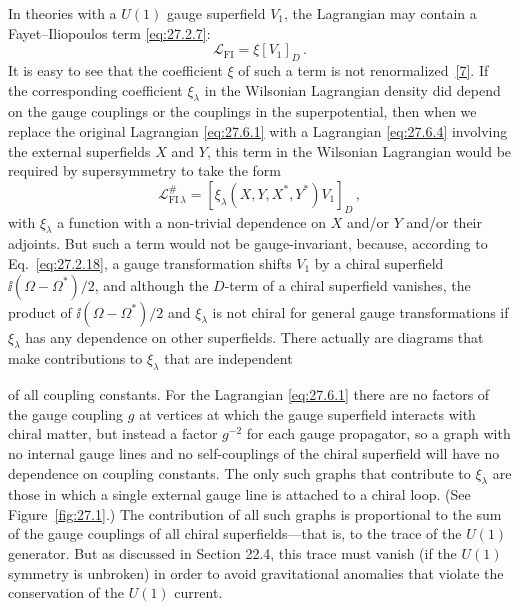 In theories with a \(U(1)\) gauge superfield \(V_1\), the Lagrangian may
contain a Fayet--Iliopoulos term \eqref{eq:27.2.7}:
\begin{equation}
  \mathcal{L}_{\mathrm{FI}}=\xi[V_1]_D\,.
  \tag{27.6.15}\label{eq:27.6.15}
\end{equation}
It is easy to see that the coefficient \(\xi\) of such a term is not
renormalized~\hyperref[ch27-ref-7]{[7]}. If the corresponding coefficient
\(\xi_\lambda\) in the Wilsonian Lagrangian density did depend on the gauge
couplings or the couplings in the superpotential, then when we replace the
original Lagrangian \eqref{eq:27.6.1} with a Lagrangian
\eqref{eq:27.6.4} involving the external superfields \(X\) and \(Y\), this
term in the Wilsonian Lagrangian would be required by supersymmetry to take
the form
\begin{equation}
  \mathcal{L}^{\#}_{\mathrm{FI}\,\lambda}
  =
  \left[
    \xi_\lambda(X,Y,X^*,Y^*)V_1
  \right]_D\,,
  \tag{27.6.16}\label{eq:27.6.16}
\end{equation}
with \(\xi_\lambda\) a function with a non-trivial dependence on \(X\)
and/or \(Y\) and/or their adjoints. But such a term would not be
gauge-invariant, because, according to Eq.~\eqref{eq:27.2.18}, a gauge
transformation shifts \(V_1\) by a chiral superfield
\(\ii(\Omega-\Omega^*)/2\), and although the \(D\)-term of a chiral superfield
vanishes, the product of \(\ii(\Omega-\Omega^*)/2\) and \(\xi_\lambda\) is not
chiral for general gauge transformations if \(\xi_\lambda\) has any
dependence on other superfields. There actually are diagrams that make
contributions to \(\xi_\lambda\) that are independent


of all coupling constants. For the Lagrangian \eqref{eq:27.6.1} there are no
factors of the gauge
coupling \(g\) at vertices at which the gauge superfield interacts with
chiral matter, but instead a factor \(g^{-2}\) for each gauge propagator, so
a graph with no internal gauge lines and no self-couplings of the chiral
superfield will have no dependence on coupling constants. The only such
graphs that contribute to \(\xi_\lambda\) are those in which a single
external gauge line is attached to a chiral loop. (See Figure~\ref{fig:27.1}.)
The contribution of all such graphs is proportional to the sum of the gauge
couplings of all chiral superfields---that is, to the trace of the \(U(1)\)
generator. But as discussed in Section 22.4, this trace must vanish (if the
\(U(1)\) symmetry is unbroken) in order to avoid gravitational anomalies
that violate the conservation of the \(U(1)\) current.

